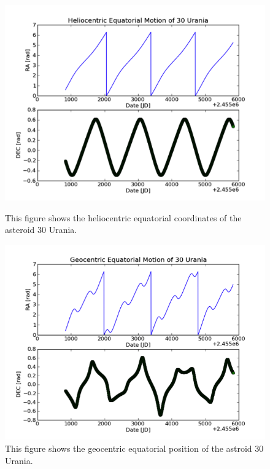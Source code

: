\documentclass[letterpaper,12pt]{article}
\begin{document}
\begin{figure}[ht]
\centering
\begin{minipage}[b]{0.4\linewidth}
  \includegraphics[scale=0.7]{ra_dec.png}
  \caption{This figure shows the heliocentric equatorial coordinates of the asteroid 30 Urania. }
  \label{fig:minipage1}
\end{minipage}
\quad
\begin{minipage}[b]{0.4\linewidth}
  \includegraphics[scale=0.62]{wiggles.png}
  \caption{This figure shows the geocentric equatorial position of the astroid 30 Urania.}
  \label{fig:minipage2}
\end{minipage}
\end{figure}
\end{document}
